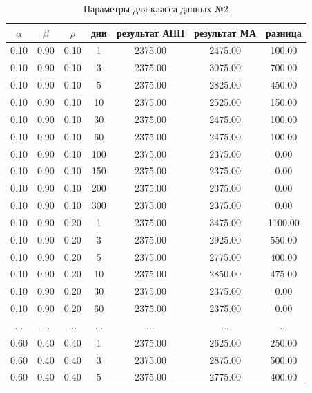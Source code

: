 \begin{table}[H]
    \centering
    \caption{Параметры для класса данных №2}
    \label{tab:class_2}
    \begin{tabular}{|c|c|c|c|c|c|c|}
        \hline
        $\alpha$ & $\beta$ & $\rho$ & дни & результат АПП & результат МА & разница \\
        \hline
  0.10 &   0.90 &   0.10 &      1 &    2375.00 &    2475.00 &     100.00  \\
  0.10 &   0.90 &   0.10 &      3 &    2375.00 &    3075.00 &     700.00  \\
  0.10 &   0.90 &   0.10 &      5 &    2375.00 &    2825.00 &     450.00  \\
  0.10 &   0.90 &   0.10 &     10 &    2375.00 &    2525.00 &     150.00  \\
  0.10 &   0.90 &   0.10 &     30 &    2375.00 &    2475.00 &     100.00  \\
  0.10 &   0.90 &   0.10 &     60 &    2375.00 &    2475.00 &     100.00  \\
  0.10 &   0.90 &   0.10 &    100 &    2375.00 &    2375.00 &       0.00  \\
  0.10 &   0.90 &   0.10 &    150 &    2375.00 &    2375.00 &       0.00  \\
  0.10 &   0.90 &   0.10 &    200 &    2375.00 &    2375.00 &       0.00  \\
  0.10 &   0.90 &   0.10 &    300 &    2375.00 &    2375.00 &       0.00  \\
  0.10 &   0.90 &   0.20 &      1 &    2375.00 &    3475.00 &    1100.00  \\
  0.10 &   0.90 &   0.20 &      3 &    2375.00 &    2925.00 &     550.00  \\
  0.10 &   0.90 &   0.20 &      5 &    2375.00 &    2775.00 &     400.00  \\
  0.10 &   0.90 &   0.20 &     10 &    2375.00 &    2850.00 &     475.00  \\
  0.10 &   0.90 &   0.20 &     30 &    2375.00 &    2375.00 &       0.00  \\
  0.10 &   0.90 &   0.20 &     60 &    2375.00 &    2375.00 &       0.00  \\
  ... &   ... &   ... &    ... &    ... &    ... &      ...  \\
  0.60 &   0.40 &   0.40 &      1 &    2375.00 &    2625.00 &     250.00  \\
  0.60 &   0.40 &   0.40 &      3 &    2375.00 &    2875.00 &     500.00  \\
  0.60 &   0.40 &   0.40 &      5 &    2375.00 &    2775.00 &     400.00  \\

\end{tabular}
\end{table}
